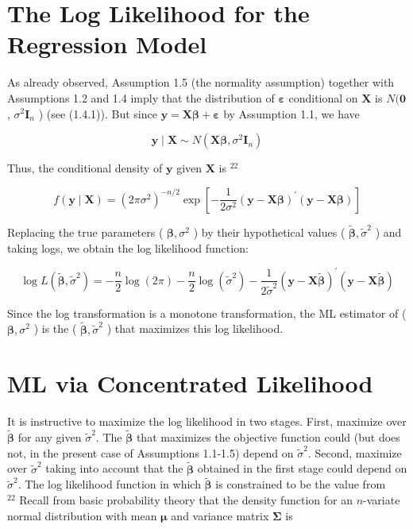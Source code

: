 \documentclass[10pt]{article}
\begin{document}
\section*{The Log Likelihood for the Regression Model}
As already observed, Assumption 1.5 (the normality assumption) together with Assumptions 1.2 and 1.4 imply that the distribution of $\boldsymbol{\varepsilon}$ conditional on $\mathbf{X}$ is $N(\mathbf{0}$, $\sigma^{2} \mathbf{I}_{n}$ ) (see (1.4.1)). But since $\mathbf{y}=\mathbf{X} \boldsymbol{\beta}+\boldsymbol{\varepsilon}$ by Assumption 1.1, we have


\begin{equation*}
\mathbf{y} \mid \mathbf{X} \sim N\left(\mathbf{X} \boldsymbol{\beta}, \sigma^{2} \mathbf{I}_{n}\right) \tag{1.5.3}
\end{equation*}


Thus, the conditional density of $\mathbf{y}$ given $\mathbf{X}$ is ${ }^{22}$


\begin{equation*}
f(\mathbf{y} \mid \mathbf{X})=\left(2 \pi \sigma^{2}\right)^{-n / 2} \exp \left[-\frac{1}{2 \sigma^{2}}(\mathbf{y}-\mathbf{X} \boldsymbol{\beta})^{\prime}(\mathbf{y}-\mathbf{X} \boldsymbol{\beta})\right] \tag{1.5.4}
\end{equation*}


Replacing the true parameters ( $\boldsymbol{\beta}, \sigma^{2}$ ) by their hypothetical values ( $\widetilde{\boldsymbol{\beta}}, \tilde{\sigma}^{2}$ ) and taking logs, we obtain the log likelihood function:


\begin{equation*}
\log L\left(\tilde{\boldsymbol{\beta}}, \tilde{\sigma}^{2}\right)=-\frac{n}{2} \log (2 \pi)-\frac{n}{2} \log \left(\tilde{\sigma}^{2}\right)-\frac{1}{2 \tilde{\sigma}^{2}}(\mathbf{y}-\mathbf{X} \tilde{\boldsymbol{\beta}})^{\prime}(\mathbf{y}-\mathbf{X} \tilde{\boldsymbol{\beta}}) \tag{1.5.5}
\end{equation*}


Since the log transformation is a monotone transformation, the ML estimator of ( $\boldsymbol{\beta}, \sigma^{2}$ ) is the ( $\widetilde{\boldsymbol{\beta}}, \tilde{\sigma}^{2}$ ) that maximizes this log likelihood.

\section*{ML via Concentrated Likelihood}
It is instructive to maximize the log likelihood in two stages. First, maximize over $\widetilde{\boldsymbol{\beta}}$ for any given $\tilde{\sigma}^{2}$. The $\tilde{\boldsymbol{\beta}}$ that maximizes the objective function could (but does not, in the present case of Assumptions 1.1-1.5) depend on $\tilde{\sigma}^{2}$. Second, maximize over $\tilde{\sigma}^{2}$ taking into account that the $\tilde{\boldsymbol{\beta}}$ obtained in the first stage could depend on $\tilde{\sigma}^{2}$. The log likelihood function in which $\tilde{\boldsymbol{\beta}}$ is constrained to be the value from\\
${ }^{22}$ Recall from basic probability theory that the density function for an $n$-variate normal distribution with mean $\boldsymbol{\mu}$ and variance matrix $\boldsymbol{\Sigma}$ is
\end{document}
